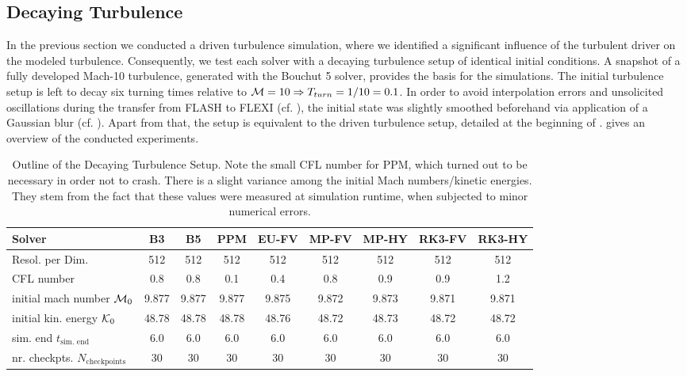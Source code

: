 \subsection{Decaying Turbulence}
\label{sec:decayturb}

In the previous section we conducted a driven turbulence simulation, where we
identified a significant influence of the turbulent driver on the modeled
turbulence. Consequently, we test each solver with a decaying turbulence setup
of identical initial conditions. A snapshot of a fully developed Mach-10
turbulence, generated with the Bouchut 5 solver, provides the basis for the
simulations. The initial turbulence setup is left to decay six turning times
relative to $\mathcal{M} = 10 \Rightarrow T_{turn} = 1/10 = 0.1$. In order to avoid
interpolation errors and unsolicited oscillations during the transfer from
FLASH to FLEXI (cf. ), the initial state was slightly smoothed beforehand via
application of a Gaussian blur (cf.
). Apart from that, the setup
is equivalent to the driven turbulence setup, detailed at the beginning of
.  gives an overview of the conducted
experiments.
\begin{table}[H]
\fontsize{3mm}{3mm}\selectfont
\caption{Outline of the Decaying Turbulence Setup. Note the small CFL number
for PPM, which turned out to be necessary in order not to crash. There is a
slight variance among the initial Mach numbers/kinetic energies. They stem from
the fact that these values were measured at simulation runtime, when
subjected to minor numerical errors.}
\centering
\begin{tabular}{l| cccc cccc}
\toprule
Solver                          & B3 & B5 & PPM & EU-FV & MP-FV & MP-HY & RK3-FV & RK3-HY \\
\midrule
Resol. per Dim.             & 512 & 512 & 512 & 512 & 512 & 512 & 512 & 512 \\
CFL number                            & 0.8 & 0.8 & 0.1 & 0.4 & 0.8 & 0.9 & 0.9 & 1.2 \\ 
initial mach number $\mathcal{M}_0$   & 9.877 & 9.877 & 9.877 & 9.875 & 9.872 & 9.873 & 9.871 & 9.871 \\
initial kin. energy $\mathcal{K}_0$   & 48.78 & 48.78 & 48.78 & 48.76 & 48.72 & 48.73 & 48.72 & 48.72 \\
sim. end $t_{\text{sim. end}}$           & 6.0 & 6.0 & 6.0 & 6.0 & 6.0 & 6.0 & 6.0 & 6.0 \\
nr. checkpts. $N_{\text{checkpoints}}$        & 30 & 30 & 30 & 30 & 30 & 30 & 30 & 30 \\
\bottomrule
\end{tabular}
\label{tab:setup-decayturb}
\end{table}

